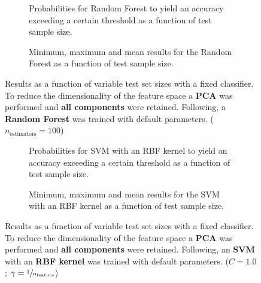 \begin{figure}
    \captionsetup[subfigure]{justification=justified,singlelinecheck=false}
    \begin{subfigure}[t]{0.61\textwidth}
        
        \caption{Probabilities for Random Forest to yield an accuracy exceeding a certain threshold as a function of test sample size.}
    \end{subfigure}
    \hspace{3.0mm}
    \begin{subfigure}[t]{0.34\textwidth}
        
        \caption{Minimum, maximum and mean results for the Random Forest as a function of test sample size.}
    \end{subfigure}
    \caption[Effects of varying test sample size. Random Forest; Preprocessing: PCA ($n_\text{components} = \text{all}$)]{Results as a function of variable test set sizes with a fixed classifier. To reduce the dimensionality of the feature space a \textbf{PCA} was performed and \textbf{all components} were retained. Following, a \textbf{{Random Forest}} was trained with default parameters. ($n_\text{estimators}=\num{100}$)}
    \label{fig:PCA_all_components_no_selection_RandomForest}
\end{figure}

\begin{figure}
    \captionsetup[subfigure]{justification=justified,singlelinecheck=false}
    \begin{subfigure}[t]{0.61\textwidth}
        
        \caption{Probabilities for SVM with an RBF kernel to yield an accuracy exceeding a certain threshold as a function of test sample size.}
    \end{subfigure}
    \hspace{3.0mm}
    \begin{subfigure}[t]{0.34\textwidth}
        
        \caption{Minimum, maximum and mean results for the SVM with an RBF kernel as a function of test sample size.}
    \end{subfigure}
    \caption[Effects of varying test sample size. SVM (kernel = RBF); Preprocessing: PCA ($n_\text{components} = \text{all}$)]{Results as a function of variable test set sizes with a fixed classifier. To reduce the dimensionality of the feature space a \textbf{PCA} was performed and \textbf{all components} were retained. Following, an \textbf{{SVM}} with an \textbf{{RBF kernel}} was trained with default parameters. ($C=\num{1.0}$; $\gamma=\sfrac{1}{n_\text{feature}}$)}
    \label{fig:PCA_all_components_no_selection_SVC}
\end{figure}

